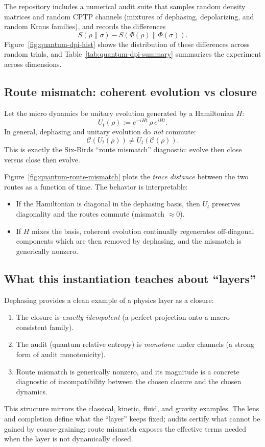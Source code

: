 \documentclass[11pt]{article}
\begin{document}
The repository includes a numerical audit suite that samples random density matrices and random CPTP channels (mixtures of dephasing, depolarizing, and random Kraus families), and records the differences
\[
  S(\rho\|\sigma) - S(\Phi(\rho)\|\Phi(\sigma)).
\]
Figure~\ref{fig:quantum-dpi-hist} shows the distribution of these differences across random trials, and Table~\ref{tab:quantum-dpi-summary} summarizes the experiment across dimensions.

\subsection{Route mismatch: coherent evolution vs closure}
Let the micro dynamics be unitary evolution generated by a Hamiltonian $H$:
\[
  U_t(\rho) := e^{-iHt}\,\rho\,e^{iHt}.
\]
In general, dephasing and unitary evolution do \emph{not} commute:
\[
  \mathcal{C}(U_t(\rho)) \neq U_t(\mathcal{C}(\rho)).
\]
This is exactly the Six-Birds ``route mismatch'' diagnostic: evolve then close versus close then evolve.

Figure~\ref{fig:quantum-route-mismatch} plots the \emph{trace distance} between the two routes as a function of time. The behavior is interpretable:
\begin{itemize}
  \item If the Hamiltonian is diagonal in the dephasing basis, then $U_t$ preserves diagonality and the routes commute (mismatch $\approx 0$).
  \item If $H$ mixes the basis, coherent evolution continually regenerates off-diagonal components which are then removed by dephasing, and the mismatch is generically nonzero.
\end{itemize}

\subsection{What this instantiation teaches about ``layers''}
Dephasing provides a clean example of a physics layer as a closure:
\begin{enumerate}
  \item The closure is \emph{exactly idempotent} (a perfect projection onto a macro-consistent family).
  \item The audit (quantum relative entropy) is \emph{monotone} under channels (a strong form of audit monotonicity).
  \item Route mismatch is generically nonzero, and its magnitude is a concrete diagnostic of incompatibility between the chosen closure and the chosen dynamics.
\end{enumerate}
This structure mirrors the classical, kinetic, fluid, and gravity examples. The lens and completion define what the ``layer'' keeps fixed; audits certify what cannot be gained by coarse-graining; route mismatch exposes the effective terms needed when the layer is not dynamically closed.
\end{document}
